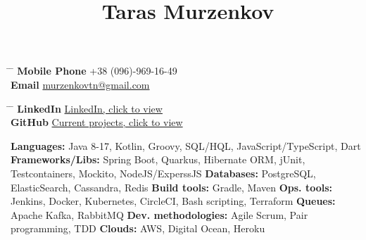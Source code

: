 \documentclass[10pt]{article} %
\begin{document}


\title{Taras Murzenkov } %


\parbox{0.2\textwidth}{ %
\begin{tabbing} %
\hspace{3cm} \= \hspace{4cm} \= \kill %
{\bf Mobile Phone} \>+38 (096)-969-16-49\\ %
{\bf Email} \> \href{mailto:murzenkovtn@gmail.com}{murzenkovtn@gmail.com} \\ %
\end{tabbing}}
\hfill %
\parbox{0.5\textwidth}{ %
\begin{tabbing} %
\hspace{3cm} \= \hspace{4cm} \= \kill %
{\bf LinkedIn} \> \href{https://www.linkedin.com/in/tarasmurzenkov}{LinkedIn, click to view} \\ %
{\bf GitHub} \> \href{https://github.com/tarasmurzenkovv/}{Current projects, click to view}\\ %

\end{tabbing}}

{
\textbf{Languages:} Java 8-17, Kotlin, Groovy, SQL/HQL, JavaScript/TypeScript, Dart\newline
\textbf{Frameworks/Libs:} Spring Boot, Quarkus, Hibernate ORM, jUnit, Testcontainers, Mockito, NodeJS/ExperssJS \newline
\textbf{Databases:}  PostgreSQL, ElasticSearch, Cassandra, Redis \newline
\textbf{Build tools:} Gradle, Maven \newline
\textbf{Ops. tools:} Jenkins, Docker, Kubernetes, CircleCI, Bash scripting, Terraform \newline
\textbf{Queues:} Apache Kafka, RabbitMQ \newline
\textbf{Dev. methodologies:} Agile Scrum, Pair programming, TDD \newline
\textbf{Clouds:} AWS, Digital Ocean, Heroku
}
\end{document}
